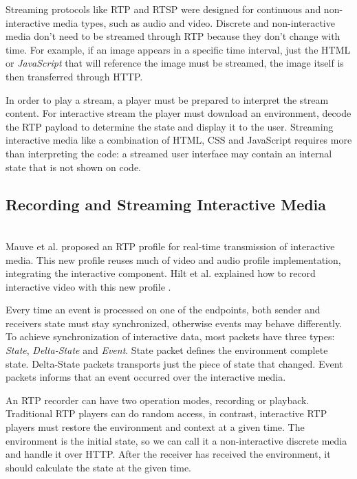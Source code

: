 	Streaming protocols like \ac {RTP} and \ac{RTSP} were designed for continuous and non-interactive media types, such as audio and video. Discrete and non-interactive media don't need to be streamed through \ac{RTP} because they don't change with time. For example, if an image appears in a specific time interval, just the \ac{HTML} or \emph{JavaScript} that will reference the image must be streamed, the image itself is then transferred through \ac{HTTP}.

	In order to play a stream, a player must be prepared to interpret the stream content. For interactive stream the player must download an environment, decode the \ac{RTP} payload to determine the state and display it to the user. Streaming interactive media like a combination of \ac{HTML}, \ac{CSS} and JavaScript requires more than interpreting the code: a streamed user interface may contain an internal state that is not shown on code.
        

 \subsection{Recording and Streaming Interactive Media}\label{intrecord}~\\
    Mauve et al. proposed an \ac{RTP} profile for real-time transmission of interactive media\cite{interactive_stream}. This new profile reuses much of video and audio profile implementation, integrating the interactive component. Hilt et al. explained how to record interactive video with this new profile \cite{interactive_record}.

	Every time an event is processed on one of the endpoints, both sender and receivers state must stay synchronized, otherwise events may behave differently.
	To achieve synchronization of interactive data, most packets have three types: \emph{State}, \emph{Delta-State} and \emph{Event}. State packet defines the environment complete state. Delta-State packets transports just the piece of state that changed. Event packets informs that an event occurred over the interactive media. 

	An \ac{RTP} recorder can have two operation modes, recording or playback. Traditional \ac{RTP} players can do random access, in contrast, interactive \ac{RTP} players must restore the environment and context at a given time. The environment is the initial state, so we can call it a non-interactive discrete media and handle it over \ac{HTTP}. After the receiver has received the environment, it should calculate the state at the given time. 

